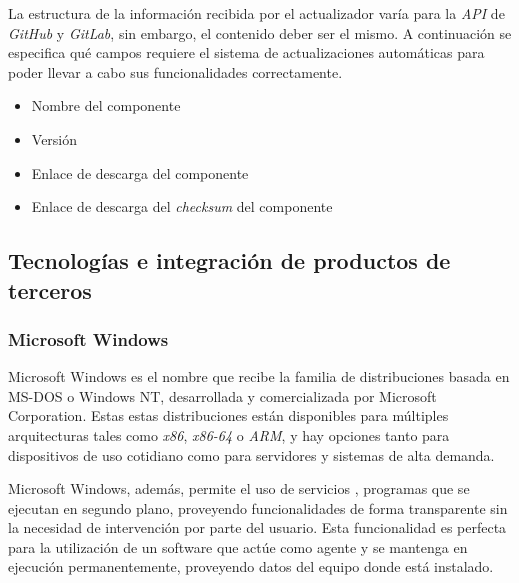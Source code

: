             La estructura de la información recibida por el actualizador varía para la \textit{API} de \textit{GitHub} y \textit{GitLab}, sin embargo, el contenido deber ser el mismo. A continuación se especifica qué campos requiere el sistema de actualizaciones automáticas para poder llevar a cabo sus funcionalidades correctamente.
            
            \begin{itemize}
                \item Nombre del componente
                \item Versión
                \item Enlace de descarga del componente
                \item Enlace de descarga del \textit{checksum} del componente
            \end{itemize}{}

    \subsection{Tecnologías e integración de productos de terceros}
        \subsubsection{Microsoft Windows}
            Microsoft Windows es el nombre que recibe la familia de distribuciones basada en MS-DOS o Windows NT, desarrollada y comercializada por Microsoft Corporation. Estas estas distribuciones están disponibles para múltiples arquitecturas tales como \textit{x86}, \textit{x86-64} o \textit{ARM}, y hay opciones tanto para dispositivos de uso cotidiano como para servidores y sistemas de alta demanda. \cite{wikiwindows}
            
            Microsoft Windows, además, permite el uso de servicios \cite{wikiservicios}, programas que se ejecutan en segundo plano, proveyendo funcionalidades de forma transparente sin la necesidad de intervención por parte del usuario. Esta funcionalidad es perfecta para la utilización de un software que actúe como agente y se mantenga en ejecución permanentemente, proveyendo datos del equipo donde está instalado.
            
